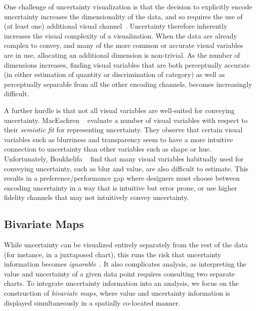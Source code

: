 
One challenge of uncertainty visualization is that the decision to explicitly encode uncertainty increases the dimensionality of the data, and so requires the use of (at least one) additional visual channel~\cite{brodlie2012review}. Uncertainty therefore inherently increases the visual complexity of a visualization. When the data are already complex to convey, and many of the more common or accurate visual variables are in use, allocating an additional dimension is non-trivial. As the number of dimensions increases, finding visual variables that are both perceptually accurate (in either estimation of quantity or discrimination of category) as well as perceptually separable from all the other encoding channels, becomes increasingly difficult. 

A further hurdle is that not all visual variables are well-suited for conveying uncertainty. MacEachren \ea~\cite{maceachren2012visual} evaluate a number of visual variables with respect to their \emph{semiotic fit} for representing uncertainty. They observe that certain visual variables such as blurriness and transparency seem to have a more intuitive connection to uncertainty than other variables such as shape or hue. Unfortunately, Boukhelifa \ea~\cite{boukhelifa2012evaluating} find that many visual variables habitually used for conveying uncertainty, such as blur and value, are also difficult to estimate. This results in a preference/performance gap where designers must choose between encoding uncertainty in a way that is intuitive but error prone, or use higher fidelity channels that may not intuitively convey uncertainty.

\subsection{Bivariate Maps}

While uncertainty can be visualized entirely separately from the rest of the data (for instance, in a juxtaposed chart), this runs the risk that uncertainty information becomes \emph{ignorable}~\cite{moritz2017trust}. It also complicates analysis, as interpreting the value and uncertainty of a given data point requires consulting two separate charts. To integrate uncertainty information into an analysis, we focus on the construction of \emph{bivariate maps}, where value and uncertainty information is displayed simultaneously in a spatially co-located manner.

